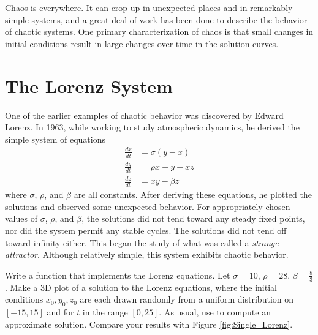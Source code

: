 
Chaos is everywhere.
It can crop up in unexpected places and in remarkably simple systems, and a great deal of work has been done to describe the behavior of chaotic systems.
One primary characterization of chaos is that small changes in initial conditions result in large changes over time in the solution curves.

\section*{The Lorenz System}
One of the earlier examples of chaotic behavior was discovered by Edward Lorenz.
In 1963, while working to study atmospheric dynamics, he derived the simple system of equations
\begin{align*}
\frac{d x}{d t} &= \sigma \left(y - x\right) \\
\frac{d y}{d t} &= \rho x - y - x z \\
\frac{d z}{d t} &= x y - \beta z
\end{align*}
where $\sigma$, $\rho$, and $\beta$ are all constants.
After deriving these equations, he plotted the solutions and observed some unexpected behavior.
For appropriately chosen values of $\sigma$, $\rho$, and $\beta$, the solutions did not tend toward any steady fixed points, nor did the system permit any stable cycles.
The solutions did not tend off toward infinity either.
This began the study of what was called a \textit{strange attractor}.
Although relatively simple, this system exhibits chaotic behavior.

\begin{problem}
Write a function that implements the Lorenz equations. Let $\sigma=10$, $\rho=28$, $\beta=\frac{8}{3}$. 
Make a 3D plot of a solution to the Lorenz equations, where the initial conditions $x_0,y_0,z_0$ are each drawn randomly from a uniform distribution on $[-15,15]$ and for \(t\) in the range \([0,25]\). 
As usual, use  to compute an approximate solution. 
Compare your results with Figure \ref{fig:Single_Lorenz}.
\end{problem}


